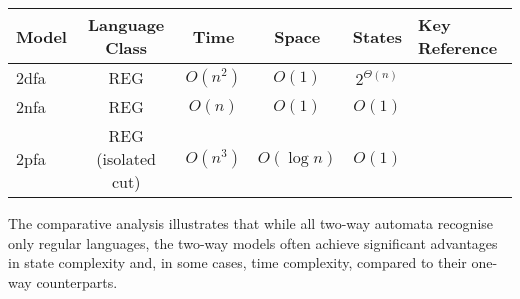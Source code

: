 \begin{tabular}{|l|c|c|c|c|l|}
    \hline
    \textbf{Model} & \textbf{Language Class} & \textbf{Time} & \textbf{Space} & \textbf{States} & \textbf{Key Reference} \\ 
    \hline
    \gls{2dfa}  & REG & \(O(n^2)\) & \(O(1)\) & \(2^{\Theta(n)}\) & \cite{shepherdson1959reduction} \\
    \gls{2nfa}  & REG & \(O(n)\) & \(O(1)\) & \(O(1)\) & \cite{sakoda1978nfas} \\
    \gls{2pfa}  & REG (isolated cut) & \(O(n^3)\) & \(O(\log n)\) & \(O(1)\) & \cite{dwork1990time} \\
    \hline
\end{tabular}

\begin{remark}
The comparative analysis illustrates that while all two-way automata recognise only regular languages, the two-way models often achieve significant advantages in state complexity and, in some cases, time complexity, compared to their one-way counterparts.
\end{remark} 

